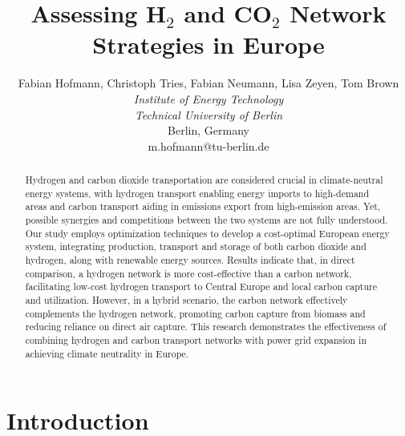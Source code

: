 \documentclass[twocolumn]{article}
\newcommand{\COtwo}{CO$_2$}
\newcommand{\Htwo}{H$_2$}
\begin{document}

\title{Assessing \Htwo{} and \COtwo{} Network Strategies in Europe}

\author{
    Fabian Hofmann, Christoph Tries, Fabian Neumann, Lisa Zeyen, Tom Brown \\
    \textit{Institute of Energy Technology} \\
    \textit{Technical University of Berlin}\\
    Berlin, Germany \\
    m.hofmann@tu-berlin.de
}


\maketitle

\begin{abstract}
    Hydrogen and carbon dioxide transportation are considered crucial in climate-neutral energy systems, with hydrogen transport enabling energy imports to high-demand areas and carbon transport aiding in emissions export from high-emission areas. Yet, possible synergies and competitions between the two systems are not fully understood. Our study employs optimization techniques to develop a cost-optimal European energy system, integrating production, transport and storage of both carbon dioxide and hydrogen, along with renewable energy sources. Results indicate that, in direct comparison, a hydrogen network is more cost-effective than a carbon network, facilitating low-cost hydrogen transport to Central Europe and local carbon capture and utilization. However, in a hybrid scenario, the carbon network effectively complements the hydrogen network, promoting carbon capture from biomass and reducing reliance on direct air capture. This research demonstrates the effectiveness of combining hydrogen and carbon transport networks with power grid expansion in achieving climate neutrality in Europe.
\end{abstract}

\section{Introduction}
\end{document}
